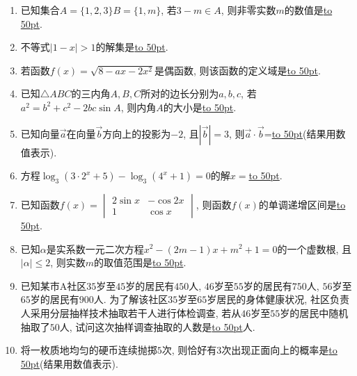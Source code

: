 \documentclass[10pt,a4paper]{article}
\newcommand{\blank}[1]{\underline{\hbox to #1pt{}}}
\begin{document}
\begin{enumerate}[1.]
\item 已知集合$A=\{1,2,3\}B=\{1,m\}$, 若$3-m\in A$, 则非零实数$m$的数值是\blank{50}.
\item 不等式$|1-x|>1$的解集是\blank{50}.
\item 若函数$f(x)=\sqrt{8-ax-2x^2}$是偶函数, 则该函数的定义域是\blank{50}.
\item 已知$\triangle ABC$的三内角$A,B,C$所对的边长分别为$a,b,c$, 若$a^2=b^2+c^2-2bc\sin A$, 则内角$A$的大小是\blank{50}.
\item 已知向量$\overrightarrow a$在向量$\overrightarrow b$方向上的投影为$-2$, 且$|\overrightarrow b|=3$, 则$\overrightarrow a\cdot \overrightarrow b$=\blank{50}(结果用数值表示).
\item 方程$\log_3(3 \cdot 2^x+5)-\log_3(4^x+1)=0$的解$x=$\blank{50}.
\item 已知函数$f(x)=\begin{vmatrix}
2\sin x & -\cos 2x  \\ 1  & \cos x  \end{vmatrix}$, 则函数$f(x)$的单调递增区间是\blank{50}.
\item 已知$\alpha$是实系数一元二次方程$x^2-(2m-1)x+m^2+1=0$的一个虚数根, 且$|\alpha|\le 2$, 则实数$m$的取值范围是\blank{50}.
\item 已知某市A社区$35$岁至$45$岁的居民有$450$人, $46$岁至$55$岁的居民有$750$人, $56$岁至$65$岁的居民有$900$人. 为了解该社区$35$岁至$65$岁居民的身体健康状况, 社区负责人采用分层抽样技术抽取若干人进行体检调查, 若从$46$岁至$55$岁的居民中随机抽取了$50$人, 试问这次抽样调查抽取的人数是\blank{50}人.
\item 将一枚质地均匀的硬币连续抛掷$5$次, 则恰好有$3$次出现正面向上的概率是\blank{50}(结果用数值表示).



\end{enumerate}
\end{document}
